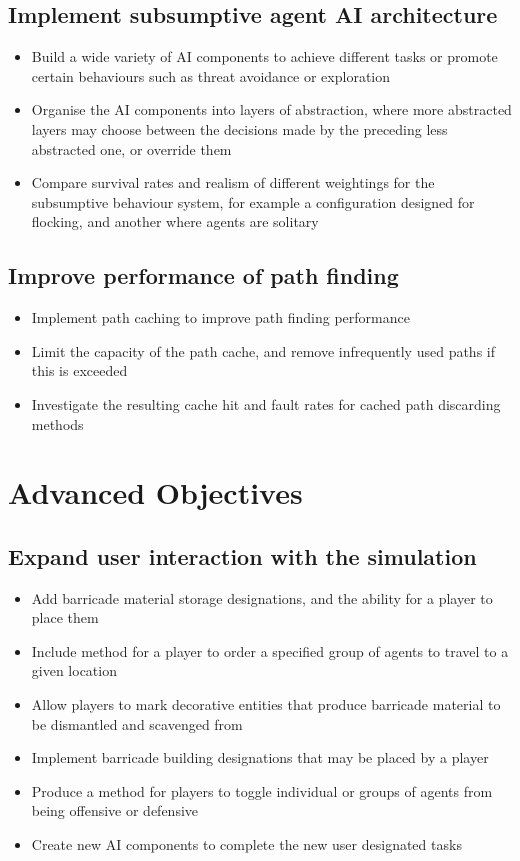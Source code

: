 \documentclass[a4paper,11pt]{article}
\begin{document}
\subsection{Implement subsumptive agent AI architecture}
    \begin{itemize}
    \item Build a wide variety of AI components to achieve different tasks
        or promote certain behaviours such as threat avoidance or
        exploration
    \item Organise the AI components into layers of abstraction, where
        more abstracted layers may choose between the decisions made by
        the preceding less abstracted one, or override them
    \item Compare survival rates and realism of different weightings
        for the subsumptive behaviour system, for example a configuration
        designed for flocking, and another where agents are solitary
    \end{itemize}
\subsection{Improve performance of path finding}
    \begin{itemize}
    \item Implement path caching to improve path finding performance
    \item Limit the capacity of the path cache, and remove infrequently
        used paths if this is exceeded
    \item Investigate the resulting cache hit and fault rates for cached
        path discarding methods
    \end{itemize}

\section{Advanced Objectives}
\subsection{Expand user interaction with the simulation}
    \begin{itemize}
    \item Add barricade material storage designations, and the ability
        for a player to place them
    \item Include method for a player to order a specified group of agents
        to travel to a given location
    \item Allow players to mark decorative entities that produce barricade
        material to be dismantled and scavenged from
    \item Implement barricade building designations that may be placed by
        a player
    \item Produce a method for players to toggle individual or groups of
        agents from being offensive or defensive
    \item Create new AI components to complete the new user designated tasks
    \end{itemize}
\end{document}
